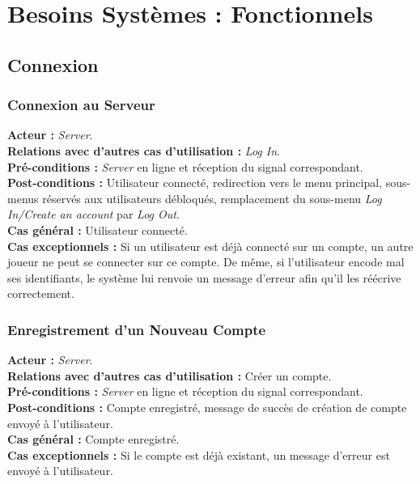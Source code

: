 \documentclass[10pt, a4paper]{article}
\begin{document}
\section{Besoins Systèmes : Fonctionnels}

\subsection{Connexion}

\subsubsection{Connexion au Serveur}
\textbf{Acteur :} \textit{Server}. \\
\textbf{Relations avec d'autres cas d'utilisation :} \textit{Log In}. \\
\textbf{Pré-conditions :} \textit{Server} en ligne et réception du signal correspondant. \\
\textbf{Post-conditions :} Utilisateur connecté, redirection vers le menu principal, sous-menus réservés aux utilisateurs débloqués, remplacement du sous-menu \textit{Log In/Create an account} par \textit{Log Out}. \\
\textbf{Cas général :} Utilisateur connecté. \\
\textbf{Cas exceptionnels :} Si un utilisateur est déjà connecté sur un compte, un autre joueur ne peut se connecter sur ce compte. De même, si l'utilisateur encode mal ses identifiants, le système lui renvoie un message d’erreur afin qu’il les réécrive correctement. \\

\subsubsection{Enregistrement d'un Nouveau Compte}
\textbf{Acteur :} \textit{Server}. \\
\textbf{Relations avec d'autres cas d'utilisation :} Créer un compte. \\
\textbf{Pré-conditions :} \textit{Server} en ligne et réception du signal correspondant. \\
\textbf{Post-conditions :} Compte enregistré, message de succès de création de compte envoyé à l'utilisateur. \\
\textbf{Cas général :} Compte enregistré. \\
\textbf{Cas exceptionnels :} Si le compte est déjà existant, un message d'erreur est envoyé à l'utilisateur. \\
\end{document}
